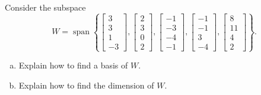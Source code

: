 
\begin{exerciseStatement}


Consider the subspace \[W=\operatorname{span}  \left\{ \left[\begin{array}{c}
3 \\
3 \\
1 \\
-3
\end{array}\right] , \left[\begin{array}{c}
2 \\
3 \\
0 \\
2
\end{array}\right] , \left[\begin{array}{c}
-1 \\
-3 \\
-4 \\
-1
\end{array}\right] , \left[\begin{array}{c}
-1 \\
-1 \\
3 \\
-4
\end{array}\right] , \left[\begin{array}{c}
8 \\
11 \\
4 \\
2
\end{array}\right] \right\} .\]


\begin{enumerate}[(a)]
\item  Explain how to find a basis of \(W\).
\item  Explain how to find the dimension of \(W\).
\end{enumerate}
    
\end{exerciseStatement}
    
